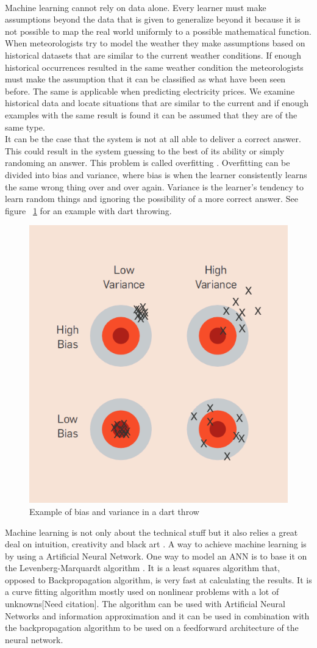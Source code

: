 \documentclass[twoside,11pt,openright]{report}
\begin{document}
\\[0.5cm] 
Machine learning cannot rely on data alone. Every learner must make assumptions beyond the data that is given to generalize beyond it \cite{18} because it is not possible to map the real world uniformly to a possible mathematical function. When meteorologists try to model the weather they make assumptions based on historical datasets that are similar to the current weather conditions. If enough historical occurrences resulted in the same weather condition the meteorologists must make the assumption that it can be classified as what have been seen before. The same is applicable when predicting electricity prices. We examine historical data and locate situations that are similar to the current and if enough examples with the same result is found it can be assumed that they are of the same type.
\\[0.5cm]
It can be the case that the system is not at all able to deliver a correct answer. This could result in the system guessing to the best of its ability or simply randoming an answer. This problem is called overfitting \cite{18}. Overfitting can be divided into bias and variance, where bias is when the learner consistently learns the same wrong thing over and over again. Variance is the learner's tendency to learn random things and ignoring the possibility of a more correct answer. See figure ~\ref{fig:biasandvariance} for an example with dart throwing.
\begin{figure}[h!]
\centering
\includegraphics[width=0.5\linewidth,natwidth=898,natheight=587]{billeder/biasVSvariance.png}
\caption{Example of bias and variance in a dart throw \cite{18}}
\label{fig:biasandvariance}
\end{figure}

Machine learning is not only about the technical stuff but it also relies a great deal on intuition, creativity and  black art \cite{18}. 
\newline A way to achieve machine learning is by using a Artificial Neural Network. One way to model an ANN is to base it on the
Levenberg-Marquardt algorithm \cite{7,9,10}. It is a least squares algorithm that,
opposed to Backpropagation algorithm\cite{8}, is very fast at calculating the
results. It is a curve fitting algorithm mostly used on nonlinear problems with
a lot of unknowns[Need citation]. The algorithm can be used with Artificial Neural Networks and information approximation\cite{8} and it can be used in combination with the backpropagation algorithm to be used on a feedforward architecture of the neural network\cite{13}.
\end{document}
